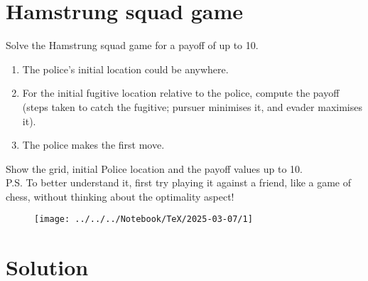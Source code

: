 \section*{Hamstrung squad game}

Solve the Hamstrung squad game for a payoff of up to 10.
\begin{enumerate}[noitemsep, topsep=0pt]
      \item The police's initial location could be anywhere.
      \item For the initial fugitive location relative to the police, compute the payoff (steps taken to catch the fugitive; pursuer minimises it, and evader maximises it).
      \item The police makes the first move.
\end{enumerate}
Show the grid, initial Police location and the payoff values up to 10. \\
P.S. To better understand it, first try playing it against a friend, like a game of chess, without thinking about the optimality aspect!

\begin{figure}[htbp]
      \centering
      \texttt{[image: ../../../Notebook/TeX/2025-03-07/1]}
\end{figure}

\vspace*{-3em}
\section*{Solution}
